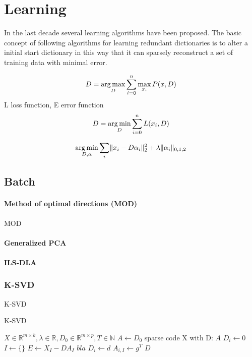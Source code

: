 \section{Learning}
\cite{Olshausen1997,Lewicki2000,Aharon2006}
In the last decade several learning algorithms have been proposed. The basic
concept of following algorithms for learning redundant dictionaries is to alter
a initial start dictionary in this way that it can sparsely reconstruct a set of
training data with minimal error. 

\begin{align} 
D = \operatorname*{arg\,max}_{D} \sum_{i=0}^n \max_{x_i} P(x,D)
\end{align}
L loss function, E error function
\begin{align} 
D = \operatorname*{arg\,min}_{D} \sum_{i=0}^n L(x_i,D)
\end{align}

\begin{align} 
\operatorname*{arg\,min}_{D,\alpha} \sum_{i}
\lVert x_i - D\alpha_i \rVert^{2}_{2}  +  \lambda \lVert \alpha_i
\rVert_{0,1,2}
\end{align}


\subsection{Batch}
\paragraph{Method of optimal directions (MOD)}
MOD\cite{Engan1999a}
\paragraph{Generalized PCA}
\cite{?}
\paragraph{ILS-DLA}
\cite{Engan2007}


\subsubsection{K-SVD}
\label{sec:k-svd}

K-SVD\cite{Aharon2006}

\begin{algorithm}
\caption{K-SVD}
\begin{algorithmic}[1]
\REQUIRE $X \in \mathbb{R}^{m \times k}, \lambda \in
\mathbb{R}, D_0 \in \mathbb{R}^{m \times p}, T \in \mathbb{N}$
\STATE $A \gets D_0$
\STATE sparse code X with D: $A$
\STATE $D_i \gets 0$
\STATE $I \gets \{\}$
\STATE $E \gets X_I - DA_I$
\STATE $bla$
\STATE $D_i \gets d$
\STATE $A_{i,I} \gets g^T$
\ENDFOR 
\ENDFOR
\RETURN $D$
\end{algorithmic}
\end{algorithm}

